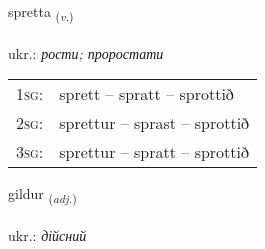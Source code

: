 \documentclass[frontgrid, backgrid]{flacards}\usepackage[]{graphicx}\usepackage[]{xcolor}
\begin{document}
\renewcommand{\flhead}{\vskip5pt \fboxsep=0pt {\small\bfseries\footnotesize Sagnorð | дієслово}}
\renewcommand{\fcfoot}{\vskip5pt \fboxsep=0pt \hspace{2pt}{\small\bfseries\footnotesize 3K}}

\renewcommand{\blhead}{\vskip5pt {\small\bfseries\footnotesize Sagnorð | дієслово }}
\renewcommand{\bcfoot}{\vskip5pt \hspace{2pt}{\small\bfseries\footnotesize 3K}}


{spretta \small{\textsubscript{(\textit{v.})}} \\[1ex] %
\textphonetic{[sprɛhta]} \\
ukr.: \emph{рости; проростати} \\  [2ex]
\renewcommand*{\arraystretch}{0.8}
\begin{tabular}{p{1cm}l}
\textsc{1sg}: & sprett -- spratt -- sprottið \\ 
\textsc{2sg}: & sprettur -- sprast -- sprottið \\ 
\textsc{3sg}: & sprettur -- spratt -- sprottið \\ 
\end{tabular}
}

\renewcommand{\flhead}{\vskip5pt \fboxsep=0pt {\small\bfseries\footnotesize Lýsingarorð | прикметник}}
\renewcommand{\fcfoot}{\vskip5pt \fboxsep=0pt \hspace{2pt}{\small\bfseries\footnotesize 3K}}

\renewcommand{\blhead}{\vskip5pt {\small\bfseries\footnotesize Lýsingarorð | прикметник }}
\renewcommand{\bcfoot}{\vskip5pt \hspace{2pt}{\small\bfseries\footnotesize 3K}}


{gildur \small{\textsubscript{(\textit{adj.})}} \\[1ex] %
\textphonetic{[cɪltʏr]} \\
ukr.: \emph{дійсний} \\  [2ex]
\renewcommand*{\arraystretch}{0.8}
}
\end{document}
